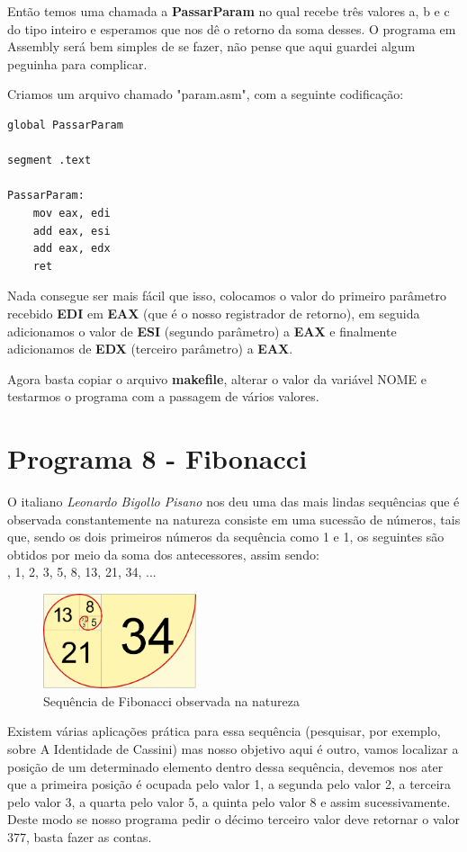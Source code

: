 Então temos uma chamada a \textbf{PassarParam} no qual recebe três valores a, b e c do tipo inteiro e esperamos que nos dê o retorno da soma desses. O programa em Assembly será bem simples de se fazer, não pense que aqui guardei algum peguinha para complicar.

Criamos um arquivo chamado "param.asm", com a seguinte codificação:
\begin{lstlisting}[]
global PassarParam

segment .text

PassarParam:
	mov eax, edi
	add eax, esi
	add eax, edx
	ret
\end{lstlisting}

Nada consegue ser mais fácil que isso, colocamos o valor do primeiro parâmetro recebido \textbf{EDI} em \textbf{EAX} (que é o nosso registrador de retorno), em seguida adicionamos o valor de \textbf{ESI} (segundo parâmetro) a \textbf{EAX} e finalmente adicionamos de \textbf{EDX} (terceiro parâmetro) a \textbf{EAX}.

Agora basta copiar o arquivo \textbf{makefile}, alterar o valor da variável NOME e testarmos o programa com a passagem de vários valores.

\section{Programa 8 - Fibonacci}
O italiano \textit{Leonardo Bigollo Pisano} nos deu uma das mais lindas sequências que é observada constantemente na natureza consiste em uma sucessão de números, tais que, sendo os dois primeiros números da sequência como 1 e 1, os seguintes são obtidos por meio da soma dos antecessores, assim sendo: \\
{, 1, 2, 3, 5, 8, 13, 21, 34, ...}
\begin{figure}[H]
	\centering
	\includegraphics[width=0.4\textwidth]{Pictures/cap02/fibonacci}
	\caption{Sequência de Fibonacci observada na natureza}
\end{figure}

Existem várias aplicações prática para essa sequência (pesquisar, por exemplo, sobre A Identidade de Cassini) mas nosso objetivo aqui é outro, vamos localizar a posição de um determinado elemento dentro dessa sequência, devemos nos ater que a primeira posição é ocupada pelo valor 1, a segunda pelo valor 2, a terceira pelo valor 3, a quarta pelo valor 5, a quinta pelo valor 8 e assim sucessivamente. Deste modo se nosso programa pedir o décimo terceiro valor deve retornar o valor 377, basta fazer as contas.

